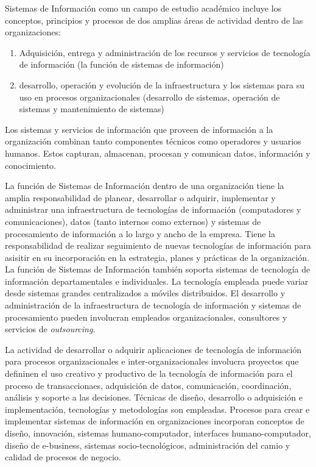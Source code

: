 Sistemas de Información como un campo de estudio académico incluye los conceptos, principios y procesos de dos amplias 
áreas  de actividad dentro de las organizaciones: 
\begin{enumerate}
\item Adquisición, entrega y administración de los recursos y servicios de tecnología de información 
      (la función de sistemas de información)
\item desarrollo, operación y evolución de la infraestructura y los sistemas para su uso en procesos 
      organizacionales (desarrollo de sistemas, operación de sistemas y mantenimiento de sistemas)
\end{enumerate}

Los sistemas y servicios de información que proveen de información a la organización combinan tanto componentes 
técnicos como operadores y usuarios humanos. Estos capturan, almacenan, procesan y comunican datos, 
información y conocimiento.

La función de Sistemas de Información dentro de una organización tiene la amplia responsabilidad de planear, desarrollar
o adquirir, implementar y administrar una infraestructura de tecnologías de información (computadores y comunicaciones),
datos (tanto internos como externos) y sistemas de procesamiento de información a lo largo y ancho de la empresa. Tiene
la responsabilidad de realizar seguimiento de nuevas tecnologías de información para asisitir en su incorporación en la
estrategia, planes y prácticas de la organización. La función de Sistemas de Información también soporta sistemas de
tecnología de información departamentales e individuales. La tecnología empleada puede variar desde sistemas grandes
centralizados a móviles distribuidos. El desarrollo y administración de la infraestructura de tecnología de información 
y sistemas de procesamiento pueden involucran empleados organizacionales, consultores y servicios de \emph{outsourcing}.

La actividad de desarrollar o adquirir aplicaciones de tecnología de información para procesos organizacionales e
inter-organizacionales involucra proyectos que defininen el uso creativo y productivo de la tecnología de información
para el proceso de transaccionaes, adquisición de datos, comunicación, coordinación, análisis y soporte a las
decisiones. Técnicas de diseño, desarrollo o adquisición e implementación, tecnologías y metodologías son empleadas.
Procesos para crear e implementar sistemas de información en organizaciones incorporan conceptos de diseño,
innovación, sistemas humano-computador, interfaces humano-computador, diseño de e-business, sistemas socio-tecnológicos,
administración del camio y calidad de procesos de negocio.







